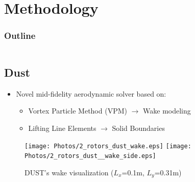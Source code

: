 \section{Methodology}
    \begin{frame}
    \frametitle{Outline}
    \begin{columns}[T]
        \begin{column}{.45\textwidth}
            \tableofcontents[sections=1-3,currentsection]
        \end{column}
        \begin{column}{.45\textwidth}
            \tableofcontents[sections=4-5,currentsection]
        \end{column}
    \end{columns}
    \end{frame}
    \subsection{Dust}
    \begin{frame}{\subsecname}
    \begin{itemize}
        \item Novel mid-fidelity aerodynamic solver based on: 
        \begin{itemize}
            \item Vortex Particle Method (VPM) $\xrightarrow{}$ Wake modeling
            \item Lifting Line Elements $\xrightarrow{}$ Solid Boundaries
        \end{itemize} 
    \end{itemize}
    \begin{figure} [H]  
	\centering
	\subfloat
	{\texttt{[image: Photos/2\_rotors\_dust\_wake.eps]}
  }
  \quad
	\subfloat
	{\texttt{[image: Photos/2\_rotors\_dust\_\_wake\_side.eps]}
  }
  \caption{DUST's wake visualization ($L_x$=0.1m, $L_y$=0.31m)}
\end{figure} 
    \end{frame}


